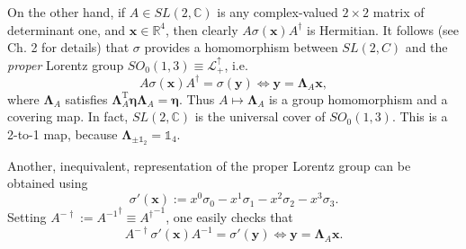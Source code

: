 \documentclass[11pt]{article}
\theoremstyle{definition}
\numberwithin{equation}{section}
\newcommand{\bx}{\mathbf{x}}
\newcommand{\by}{\mathbf{y}}
\newcommand{\beq}{\begin{equation}}
\newcommand{\eeq}{\end{equation}}
\newcommand{\Id}{\mathds{1}}
\newcommand{\bLa}{\boldsymbol{\Lambda}}
\newcommand{\Cset}{{\mathbb C}}
\newcommand{\Rset}{{\mathbb R}}
\newcommand{\si}{\sigma}
\begin{document}
  On the other hand, if $A \in SL(2,\Cset)$ is any complex-valued $2\times 2$ matrix of determinant one, and $\bx \in \Rset^4$, then
 clearly $A\si(\bx)A^\dagger$ is Hermitian.
 It follows (see \cite{ThallerBOOK} Ch. 2 for details) that $\si$ provides a homomorphism between $SL(2,C)$ and the {\em proper} 
Lorentz group  $SO_0(1,3)\equiv\mathcal{L}^\uparrow_+$, i.e.
\beq \label{six}
A \si(\bx) A^\dagger = \si(\by) \iff \by = \bLa_A \bx,
\eeq
where $\bLa_A$ satisfies $\bLa_A^{\mathrm{T}} \boldsymbol{\eta} \bLa_A = \boldsymbol{\eta}$. 
 Thus $A \mapsto \bLa_A$ is a group homomorphism and a covering map.
 In fact,  $SL(2,\Cset)$ is the universal cover of $SO_0(1,3)$.
 This is a 2-to-1 map, because $\bLa_{\pm \Id_2 }= \Id_4$.


 Another, inequivalent, representation of the proper Lorentz group can be obtained using 
\beq \label{def:sipx}
\si'(\bx) := x^0 \si_0 - x^1\si_1 - x^2\si_2 - x^3 \si_3.
\eeq
 Setting $A^{-\dag} := {A^{-1}}^\dag \equiv {A^\dag}^{-1}$, one easily checks that 
\beq \label{siprx}
A^{-\dag} \si'(\bx) A^{-1} = \si'(\by) \iff \by = \bLa_A \bx.
\eeq
\end{document}
